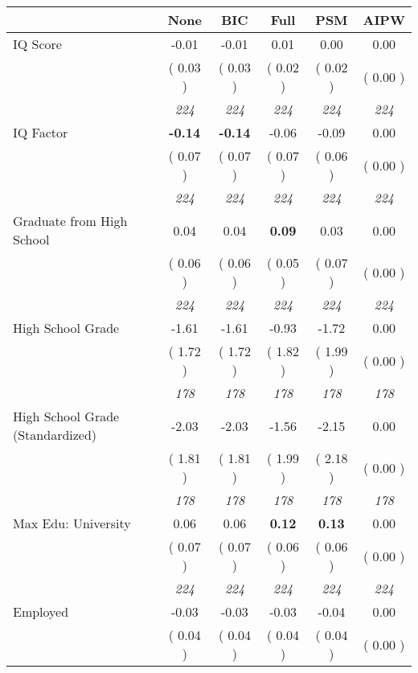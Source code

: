 \begin{tabular}{l c c c c c}
\toprule
 & None & BIC & Full & PSM & AIPW \\
\midrule
IQ Score &     -0.01 &     -0.01 &      0.01 &      0.00 &      0.00 \\
& (     0.03 ) & (     0.03 ) & (     0.02 ) & (     0.02 ) & (     0.00 ) \\
& \textit{ 224 } & \textit{ 224 } & \textit{ 224 } & \textit{ 224 } & \textit{ 224 } \\
IQ Factor & \textbf{     -0.14 } & \textbf{     -0.14 } &     -0.06 &     -0.09 &      0.00 \\
& (     0.07 ) & (     0.07 ) & (     0.07 ) & (     0.06 ) & (     0.00 ) \\
& \textit{ 224 } & \textit{ 224 } & \textit{ 224 } & \textit{ 224 } & \textit{ 224 } \\
Graduate from High School &      0.04 &      0.04 & \textbf{      0.09 } &      0.03 &      0.00 \\
& (     0.06 ) & (     0.06 ) & (     0.05 ) & (     0.07 ) & (     0.00 ) \\
& \textit{ 224 } & \textit{ 224 } & \textit{ 224 } & \textit{ 224 } & \textit{ 224 } \\
High School Grade &     -1.61 &     -1.61 &     -0.93 &     -1.72 &      0.00 \\
& (     1.72 ) & (     1.72 ) & (     1.82 ) & (     1.99 ) & (     0.00 ) \\
& \textit{ 178 } & \textit{ 178 } & \textit{ 178 } & \textit{ 178 } & \textit{ 178 } \\
High School Grade (Standardized) &     -2.03 &     -2.03 &     -1.56 &     -2.15 &      0.00 \\
& (     1.81 ) & (     1.81 ) & (     1.99 ) & (     2.18 ) & (     0.00 ) \\
& \textit{ 178 } & \textit{ 178 } & \textit{ 178 } & \textit{ 178 } & \textit{ 178 } \\
Max Edu: University &      0.06 &      0.06 & \textbf{      0.12 } & \textbf{     0.13} &      0.00 \\
& (     0.07 ) & (     0.07 ) & (     0.06 ) & (     0.06 ) & (     0.00 ) \\
& \textit{ 224 } & \textit{ 224 } & \textit{ 224 } & \textit{ 224 } & \textit{ 224 } \\
Employed &     -0.03 &     -0.03 &     -0.03 &     -0.04 &      0.00 \\
& (     0.04 ) & (     0.04 ) & (     0.04 ) & (     0.04 ) & (     0.00 ) \\

\end{tabular}
